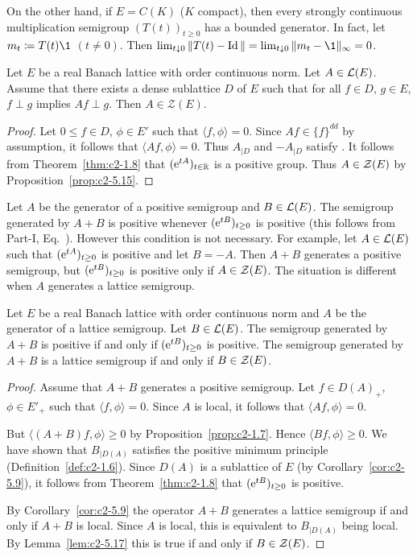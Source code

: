 On the other hand, if\/ $E = C(K)$ ($K$ compact), then every strongly continuous multiplication semigroup $(T(t))_{t \geq 0}$ has a bounded generator.
In fact, let $m_t \coloneq T(t)\1$ $(t \neq 0)$.
Then $\lim_{t \downarrow 0}\|T(t) - \Id\| =    \lim_{t \downarrow 0}\|m_t - \1\|_{\infty} = 0$.
\begin{lemma}\label{lem:c2-5.17}
%
Let $E$ be a real Banach lattice with order continuous norm.
Let $A \in \mathcal{L}(E)$.
Assume that there exists a dense sublattice $D$ of\/ $E$ such that for all $f \in D$, $g \in E$, $f \perp g$ implies $Af \perp g$.
Then $A \in \mathcal{Z}(E)$.
\end{lemma}
\begin{proof}
Let $0 \leq f \in D$, $\phi \in E'$ such that $\langle f,\phi \rangle = 0$.
Since $Af \in \{f\}^{dd}$ by assumption, it follows that $\langle Af,\phi \rangle = 0$.
Thus $A_{\vert D }$ and $-A_{\vert D}$ satisfy .
It follows from Theorem~\ref{thm:c2-1.8}    that $(\mathrm{e}^{tA})_{t \in \mathbb{R}}$ is a positive group.
Thus $A \in \mathcal{Z}(E)$ by  Proposition~\ref{prop:c2-5.15}.
\end{proof}
Let $A$ be the generator of a positive semigroup and $B \in \mathcal{L}(E)$. 
The semigroup generated by $A + B$ is positive whenever $(\eu^{tB})_{t \geq 0}$ is positive (this follows from Part-I, Eq.~).
However this condition is not necessary. 
For example, let $A \in \mathcal{L}(E)$ such that $(\eu^{tA})_{t \geq 0}$ is positive and let $B = -A$.
Then $A + B$ generates a positive semigroup, but $(\eu^{tB})_{t \geq 0}$ is positive only if\/ $A \in \mathcal{Z}(E)$.
The situation is different when $A$ generates a lattice semigroup.
\begin{theorem}\label{thm:c2-5.18}
Let $E$ be a real Banach lattice with order continuous norm and $A$ be the generator of a lattice semigroup.
Let $B \in \mathcal{L}(E)$.
The semigroup generated by $A + B$ is positive if and only if\/ $(\eu^{tB})_{t \geq 0}$ is positive.
The semigroup generated by $A + B$ is a lattice semigroup if and only if\/ $B \in \mathcal{Z}(E)$.
\end{theorem}
\begin{proof}
Assume that $A + B$ generates a positive semigroup.
Let $f \in D(A)_{+}$, $\phi \in E'_{+}$ such that $\langle f,\phi \rangle = 0$.
Since $A$ is local, it follows that $\langle Af,\phi \rangle = 0$.

But $\langle (A+B)f,\phi \rangle \geq 0$ by  Proposition~\ref{prop:c2-1.7}.
Hence $\langle Bf,\phi \rangle \geq 0$.
We have shown that $B_{\vert D(A)}$ satisfies the positive minimum principle (Definition~\ref{def:c2-1.6}).
Since $D(A)$ is a sublattice of\/ $E$ (by Corollary~\ref{cor:c2-5.9}), it follows from Theorem~\ref{thm:c2-1.8}   that $(\eu^{tB})_{t \geq 0}$ is positive.

By Corollary~\ref{cor:c2-5.9} the operator $A + B$ generates a lattice semigroup if and only if\/ $A + B$ is local.
Since $A$ is local, this is equivalent to $B_{\vert D(A)}$ being local.
By Lemma~\ref{lem:c2-5.17} this is true if and only if\/ $B \in \mathcal{Z}(E)$.
\end{proof}

